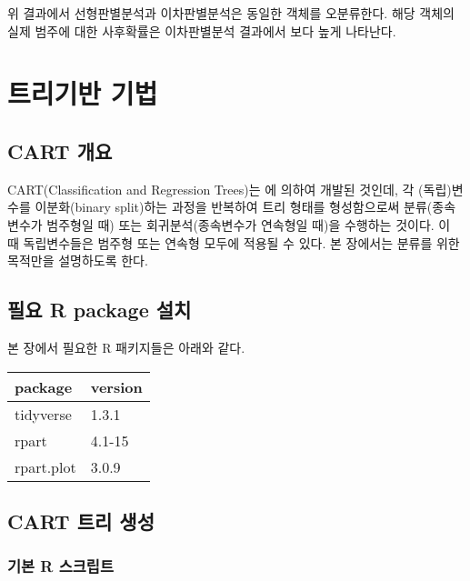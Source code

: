 \documentclass[
]{book}
\begin{document}
위 결과에서 선형판별분석과 이차판별분석은 동일한 객체를 오분류한다. 해당 객체의 실제 범주에 대한 사후확률은 이차판별분석 결과에서 보다 높게 나타난다.

\hypertarget{tree-based-method}{%
\chapter{트리기반 기법}\label{tree-based-method}}

\hypertarget{cart-overview}{%
\section{CART 개요}\label{cart-overview}}

CART(Classification and Regression Trees)는 \citet{breiman1984classification} 에 의하여 개발된 것인데, 각 (독립)변수를 이분화(binary split)하는 과정을 반복하여 트리 형태를 형성함으로써 분류(종속변수가 범주형일 때) 또는 회귀분석(종속변수가 연속형일 때)을 수행하는 것이다. 이 때 독립변수들은 범주형 또는 연속형 모두에 적용될 수 있다. 본 장에서는 분류를 위한 목적만을 설명하도록 한다.

\hypertarget{cart-packages-install}{%
\section{필요 R package 설치}\label{cart-packages-install}}

본 장에서 필요한 R 패키지들은 아래와 같다.

\begin{tabular}{l|l}
\hline
package & version\\
\hline
tidyverse & 1.3.1\\
\hline
rpart & 4.1-15\\
\hline
rpart.plot & 3.0.9\\
\hline
\end{tabular}

\hypertarget{cart-build}{%
\section{CART 트리 생성}\label{cart-build}}

\hypertarget{cart-basic-r-script}{%
\subsection{기본 R 스크립트}\label{cart-basic-r-script}}
\end{document}
